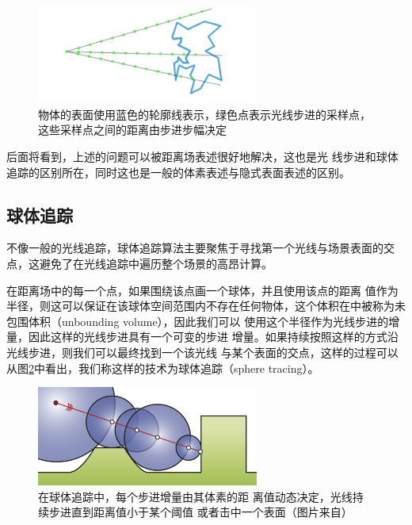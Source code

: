 \begin{figure}
	\sidecaption
	\includegraphics[width=0.65\textwidth]{figures/df/ray-marching-problems}
	\caption{物体的表面使用蓝色的轮廓线表示，绿色点表示光线步进的采样点，这些采样点之间的距离由步进步幅决定}
	\label{f:df-ray-marching-problems}
\end{figure}

后面将看到，上述的问题可以被距离场表述很好地解决，这也是光 线步进和球体追踪的区别所在，同时这也是一般的体素表述与隐式表面表述的区别。




\subsection{球体追踪}
不像一般的光线追踪，球体追踪算法主要聚焦于寻找第一个光线与场景表面的交点，这避免了在光线追踪中遍历整个场景的高昂计算。

在距离场中的每一个点，如果围绕该点画一个球体，并且使用该点的距离 值作为半径，则这可以保证在该球体空间范围内不存在任何物体，这个体积在\cite{a:Ray-Tracing-Deterministic-3-DFractals}中被称为未包围体积（unbounding volume），因此我们可以 使用这个半径作为光线步进的增量，因此这样的光线步进具有一个可变的步进 增量。如果持续按照这样的方式沿光线步进，则我们可以最终找到一个该光线 与某个表面的交点，这样的过程可以从图\ref{f:df-sphere_tracing}中看出，我们称这样的技术为球体追踪（sphere tracing）。

\begin{figure}
	\sidecaption
	\includegraphics[width=0.65\textwidth]{figures/df/sphere_tracing}
	\caption{在球体追踪中，每个步进增量由其体素的距 离值动态决定，光线持续步进直到距离值小于某个阈值 或者击中一个表面（图片来自\cite{a:Enhanced-Sphere-Tracing}）}
	\label{f:df-sphere_tracing}
\end{figure}

